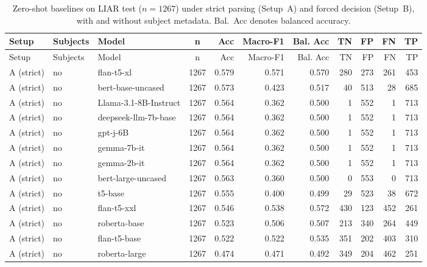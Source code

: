 \begin{landscape}
\begin{longtable}{lllc r r r r r r r}
\caption{Zero-shot baselines on LIAR test ($n=1267$) under strict parsing (Setup~A) and forced decision (Setup~B), with and without subject metadata. Bal.\ Acc denotes balanced accuracy.}
\label{tab:zeroshot_setups}\\
\toprule
Setup & Subjects & Model & n & Acc & Macro-F1 & Bal. Acc & TN & FP & FN & TP \\
\midrule
\endfirsthead

\toprule
Setup & Subjects & Model & n & Acc & Macro-F1 & Bal. Acc & TN & FP & FN & TP \\
\midrule
\endhead

\bottomrule
\endfoot

A (strict) & no  & flan-t5-xl            & 1267 & 0.579 & 0.571 & 0.570 & 280 & 273 & 261 & 453 \\
A (strict) & no  & bert-base-uncased     & 1267 & 0.573 & 0.423 & 0.517 &  40 & 513 &  28 & 685 \\
A (strict) & no  & Llama-3.1-8B-Instruct & 1267 & 0.564 & 0.362 & 0.500 &   1 & 552 &   1 & 713 \\
A (strict) & no  & deepseek-llm-7b-base  & 1267 & 0.564 & 0.362 & 0.500 &   1 & 552 &   1 & 713 \\
A (strict) & no  & gpt-j-6B              & 1267 & 0.564 & 0.362 & 0.500 &   1 & 552 &   1 & 713 \\
A (strict) & no  & gemma-7b-it           & 1267 & 0.564 & 0.362 & 0.500 &   1 & 552 &   1 & 713 \\
A (strict) & no  & gemma-2b-it           & 1267 & 0.564 & 0.362 & 0.500 &   1 & 552 &   1 & 713 \\
A (strict) & no  & bert-large-uncased    & 1267 & 0.563 & 0.360 & 0.500 &   0 & 553 &   0 & 713 \\
A (strict) & no  & t5-base               & 1267 & 0.555 & 0.400 & 0.499 &  29 & 523 &  38 & 672 \\
A (strict) & no  & flan-t5-xxl           & 1267 & 0.546 & 0.538 & 0.572 & 430 & 123 & 452 & 261 \\
A (strict) & no  & roberta-base          & 1267 & 0.523 & 0.506 & 0.507 & 213 & 340 & 264 & 449 \\
A (strict) & no  & flan-t5-base          & 1267 & 0.522 & 0.522 & 0.535 & 351 & 202 & 403 & 310 \\
A (strict) & no  & roberta-large         & 1267 & 0.474 & 0.471 & 0.492 & 349 & 204 & 462 & 251 \\


\end{longtable}
\end{landscape}
